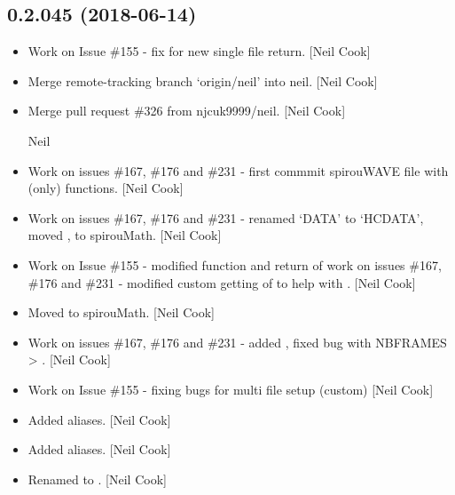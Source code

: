 \documentclass[a4paper,10pt,english]{report}
\begin{document}
\subsection{0.2.045 (2018-06-14)}
\label{\detokenize{misc/changelog:id421}}\begin{itemize}
\item {} 
Work on Issue \#155 - fix for new single file return. {[}Neil Cook{]}

\item {} 
Merge remote-tracking branch ‘origin/neil’ into neil. {[}Neil Cook{]}

\item {} 
Merge pull request \#326 from njcuk9999/neil. {[}Neil Cook{]}

Neil

\item {} 
Work on issues \#167, \#176 and \#231 - first commmit spirouWAVE file
with  (only) functions. {[}Neil Cook{]}

\item {} 
Work on issues \#167, \#176 and \#231 - renamed ‘DATA’ to ‘HCDATA’, moved
,  to spirouMath. {[}Neil Cook{]}

\item {} 
Work on Issue \#155 - modified  function and return of
 work on issues \#167, \#176 and \#231 - modified custom
getting of  to help with . {[}Neil Cook{]}

\item {} 
Moved  to spirouMath. {[}Neil Cook{]}

\item {} 
Work on issues \#167, \#176 and \#231 - added , fixed bug with
NBFRAMES  \textendash{}\textgreater{} . {[}Neil Cook{]}

\item {} 
Work on Issue \#155 - fixing bugs for multi file setup (custom) {[}Neil
Cook{]}

\item {} 
Added aliases. {[}Neil Cook{]}

\item {} 
Added aliases. {[}Neil Cook{]}

\item {} 
Renamed  to . {[}Neil Cook{]}


\end{itemize}
\end{document}
